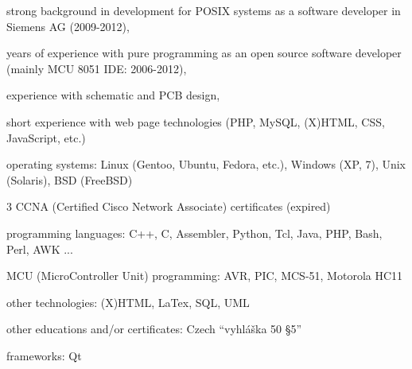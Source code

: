 \documentclass[a4paper,twoside,15pt]{book}
\begin{document}
                \begin{dinglist}{73}
                    \setlength{\itemsep}{-3pt}
                    \item strong background in development for POSIX systems as a software developer in Siemens AG (2009-2012),
                    \item years of experience with pure programming as an open source software developer (mainly MCU 8051 IDE: 2006-2012),
                    \item experience with schematic and PCB design,
                    \item short experience with web page technologies (PHP, MySQL, (X)HTML, CSS, JavaScript, etc.)
                    \item operating systems: Linux (Gentoo, Ubuntu, Fedora, etc.), Windows (XP, 7), Unix (Solaris), BSD (FreeBSD)
                    \item 3 CCNA (Certified Cisco Network Associate) certificates (expired)
                    \item programming languages: C++, C, Assembler, Python, Tcl, Java, PHP, Bash, Perl, AWK ...
                    \item MCU (MicroController Unit) programming: AVR, PIC, MCS-51, Motorola HC11
                    \item other technologies: (X)HTML, LaTex, SQL, UML
                    \item other educations and/or certificates: Czech ``vyhláška 50 §5''
                    \item frameworks: Qt
                \end{dinglist}
\end{document}
